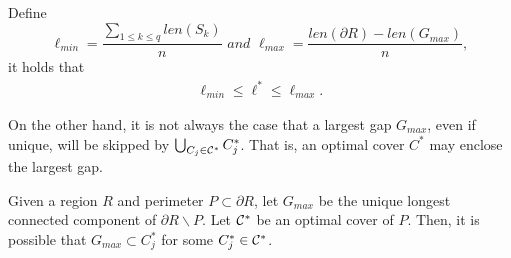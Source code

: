 \begin{proposition}\label{p:opg-single-bounds} Define 
\[
\ell_{min} = \frac{\sum_{1\le k\le q}len(S_k)}{n}\,\,and\,\,
\ell_{max} = \frac{len(\partial R) -  len(G_{max})}{n},
\]
it holds that 
\begin{align}\label{eq:opg-lopt} 
\ell_{min} \le \ell^* \le \ell_{max}.
\end{align}
\end{proposition}

On the other hand, it is not always the case that a largest gap $G_{max}$, 
even if unique, will be skipped by $\bigcup_{C_j \in \mathcal C^*} C_j^*$. 
That is, an optimal cover $C^*$ may enclose the largest gap. 
 
\begin{proposition}\label{p:opg-max-no-exclusion}
Given a region $R$ and perimeter $P \subset \partial R$, let
$G_{max}$ be the unique longest connected component of $\partial R
\backslash P$. Let $\mathcal C^*$ be an optimal cover of $P$. Then, it is 
possible that $G_{max} \subset C_j^*$ for some $C_j^* \in \mathcal C^*$. 
\end{proposition}
